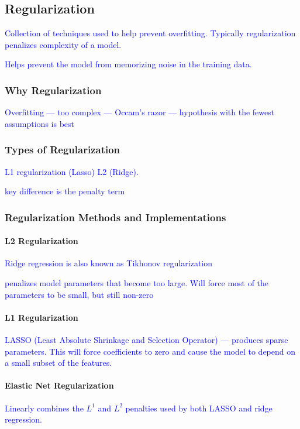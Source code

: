 \subsection{Regularization}

\textcolor{blue}{Collection of techniques used to help prevent overfitting. Typically regularization penalizes complexity of a model.}

\textcolor{blue}{Helps prevent the model from memorizing noise in the training data.}


\subsubsection{Why Regularization}

\textcolor{blue}{Overfitting --- too complex --- Occam's razor --- hypothesis with the fewest assumptions is best}


\subsubsection{Types of Regularization}

\textcolor{blue}{ L1 regularization (Lasso) L2 (Ridge).}

\textcolor{blue}{key difference is the penalty term}


\subsubsection{Regularization Methods and Implementations}

\paragraph{L2 Regularization}

\textcolor{blue}{Ridge regression is also known as {Tikhonov regularization}}

\textcolor{blue}{penalizes model parameters that become too large. Will force most of the parameters to be small, but still non-zero}


\paragraph{L1 Regularization}

\textcolor{blue}{LASSO (Least Absolute Shrinkage and Selection Operator) --- produces sparse parameters. This will force coefficients to zero and cause the model to depend on a small subset of the features.}


\paragraph{Elastic Net Regularization}

\textcolor{blue}{Linearly combines the $L^1$ and $L^2$ penalties used by both LASSO and ridge regression.}